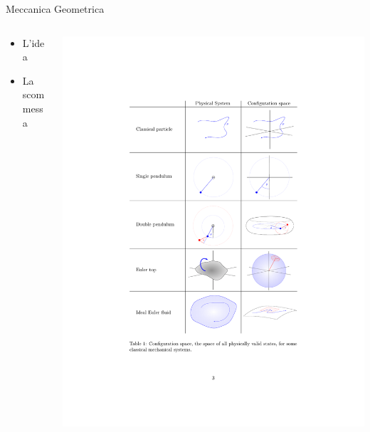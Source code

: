 \documentclass{beamer}
\begin{document}
		\begin{frame}{Meccanica Geometrica}
  			\begin{columns}[T]
    			\begin{column}{.5\textwidth}		
					\begin{itemize}
						\item L'idea
						\item La scommessa				
					\end{itemize}
    			\end{column}
    		   	\begin{column}{.5\textwidth}
							\includegraphics[width=\textwidth]{Presentazione/GeoMec_Crop} 				
    			\end{column}
  			\end{columns}	
	\end{frame}
	
\end{document}
